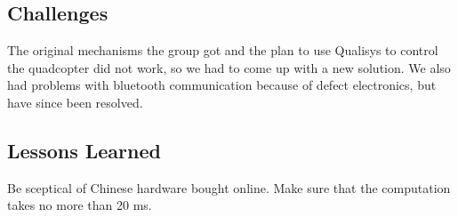 \subsection{Challenges}

The original mechanisms the group got and the plan to use Qualisys to control the quadcopter did not work, so we had to come up with a new solution. We also had problems with bluetooth communication because of defect electronics, but have since been resolved.

\subsection{Lessons Learned}

Be sceptical of Chinese hardware bought online. Make sure that the computation takes no more than 20 ms.  


